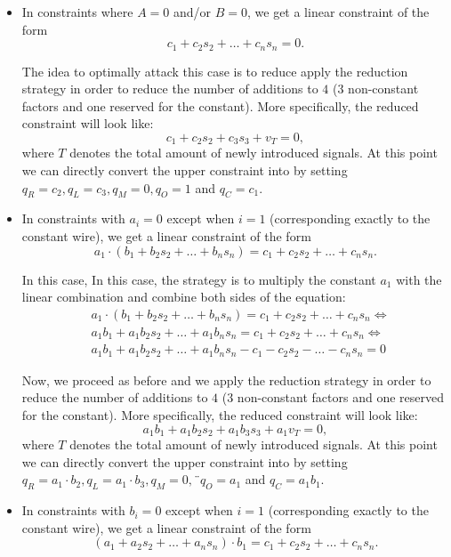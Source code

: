 \begin{itemize}


\item In constraints where $A = 0$ and/or $B = 0$, we get a linear constraint of the form
\[
c_{1} + c_{2} s_2 + \dots + c_{n} s_n = 0.
\]

The idea to optimally attack this case is to reduce apply the reduction strategy in order to reduce the number of additions to $4$ ($3$ non-constant factors and one reserved for the constant). More specifically, the reduced constraint will look like:
\[
c_1 + c_2 s_2 + c_3 s_3 + v_T = 0,
\]
where $T$ denotes the total amount of newly introduced signals. At this point we can directly convert the upper constraint into \plonk by setting $q_R = c_2, q_L = c_3, q_M = 0, q_O = 1$ and $q_C = c_1$. 


\item In constraints with $a_i = 0$ except when $i = 1$ (corresponding exactly to the constant wire), we get a linear constraint of the form
\[
a_1 \cdot (b_{1} + b_{2} s_2 + \dots + b_{n} s_n) = c_{1} + c_{2} s_2 + \dots + c_{n} s_n.
\]

In this case,  In this case, the strategy is to multiply the constant $a_1$ with the linear combination and combine both sides of the equation:
\begin{align*}
&a_1 \cdot (b_{1} + b_{2} s_2 + \dots + b_{n} s_n) = c_{1} + c_{2} s_2 + \dots + c_{n} s_n \Longleftrightarrow \\
&a_1 b_1 + a_1 b_2 s_2 + \dots + a_1 b_n s_n  = c_{1} + c_{2} s_2 + \dots + c_{n} s_n \Longleftrightarrow \\
&a_1 b_1 + a_1 b_2 s_2 + \dots + a_1 b_n s_n - c_1 - c_2 s_2 - \dots - c_n s_n = 0
\end{align*}

Now, we proceed as before and we apply the reduction strategy in order to reduce the number of additions to $4$ ($3$ non-constant factors and one reserved for the constant). More specifically, the reduced constraint will look like:
\[
a_1 b_1 + a_1 b_2 s_2 + a_1 b_3 s_3 + a_1 v_T = 0,
\]
where $T$ denotes the total amount of newly introduced signals. At this point we can directly convert the upper constraint into \plonk by setting $q_R = a_1 \cdot b_2, q_L = a_1 \cdot b_3, q_M = 0, ¨q_O = a_1$ and $q_C = a_1 b_1$. 

\item In constraints with $b_i = 0$ except when $i = 1$ (corresponding exactly to the constant wire), we get a linear constraint of the form
\[
(a_{1} + a_{2} s_2 + \dots + a_{n} s_n) \cdot b_1 = c_{1} + c_{2} s_2 + \dots + c_{n} s_n.
\]


\end{itemize}
